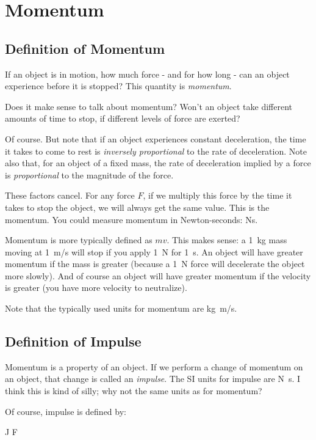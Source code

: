 \section{Momentum}

\subsection{Definition of Momentum}

If an object is in motion, how much force - and for how long - can an
object experience before it is stopped? This quantity is
\emph{momentum}.

Does it make sense to talk about momentum? Won't an object take
different amounts of time to stop, if different levels of force are
exerted?

Of course. But note that if an object experiences constant deceleration,
the time it takes to come to rest is \emph{inversely proportional} to
the rate of deceleration. Note also that, for an object of a fixed mass,
the rate of deceleration implied by a force is \emph{proportional} to
the magnitude of the force.

These factors cancel. For any force $F$, if we multiply this force by
the time it takes to stop the object, we will always get the same value.
This is the momentum. You could measure momentum in Newton-seconds:
\si{N}\si{s}.

Momentum is more typically defined as $mv$. This makes sense: a
\SI{1}{kg} mass moving at \SI{1}{m/s} will stop if you apply \SI{1}{N}
for \SI{1}{s}. An object will have greater momentum if the mass is
greater (because a \SI{1}{N} force will decelerate the object more
slowly). And of course an object will have greater momentum if the
velocity is greater (you have more velocity to neutralize).

Note that the typically used units for momentum are \si{kg.m/s}.

\subsection{Definition of Impulse}

Momentum is a property of an object. If we perform a change of momentum
on an object, that change is called an \emph{impulse}. The SI units for
impulse are \si{N.s}. I think this is kind of silly; why not the same
units as for momentum?

Of course, impulse is defined by:

\begin{nedqn}
  J
  \int F \dt
\end{nedqn}

